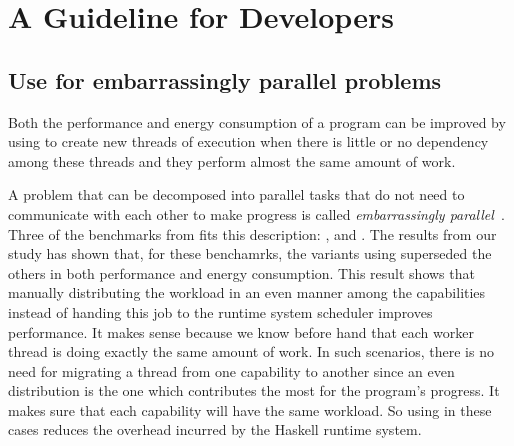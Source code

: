 \chapter{A Guideline for Developers}
\lipsum[1-2]


\section{Use \forkOn for embarrassingly parallel problems}
 Both the performance and energy consumption of a program can be improved by using \forkOn to create new threads of execution when there is little or no dependency among these threads and they perform almost the same amount of work.
\newline

 A problem that can be decomposed into parallel tasks that do not need to communicate with each other to make progress is called \emph{embarrassingly parallel}~\cite{herlihy:2012}. Three of the benchmarks from  fits this description: \mandelbrot, \regex and \spectral. The results from our study has shown that, for these benchamrks, the variants using \forkOn superseded the others in both performance and energy consumption. This result shows that manually distributing the workload in an even manner among the capabilities instead of handing this job to the runtime system scheduler improves performance. It makes sense because we know before hand that each worker thread is doing exactly the same amount of work. In such scenarios, there is no need for migrating a thread from one capability to another since an even distribution is the one which contributes the most for the program's progress. It makes sure that each capability will have the same workload. So using \forkOn in these cases reduces the overhead incurred by the Haskell runtime system.

